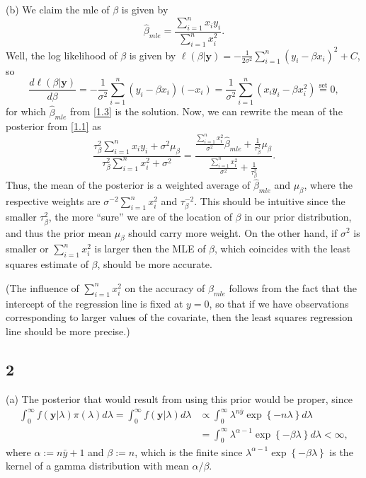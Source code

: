 \documentclass[12pt]{article}
\begin{document}
(b) We claim the mle of $\beta$ is given by 
\begin{equation}
  \hat{\beta}_{mle} = \frac{\sum_{i=1}^{n}x_i y_i}{\sum_{i=1}^{n}x_i^2}.
  \label{1.3}
\end{equation}
Well, the log likelihood of $\beta$ is given by $\ell(\beta|\bm{y}) = -\frac{1}{2\sigma^{2}}\sum_{i=1}^{n}(y_i - \beta x_i)^{2} + C$, so 
\[
  \frac{d\ell(\beta|\bm{y})}{d\beta} = -\frac{1}{\sigma^{2}}\sum_{i=1}^{n}(y_i - \beta x_i)(-x_i) = \frac{1}{\sigma^{2}}\sum_{i=1}^{n}(x_i y_i - \beta
x_i^{2}) \stackrel{\text{set}}{=} 0, \]
for which $\hat{\beta}_{mle}$ from \eqref{1.3} is the solution. Now, we can rewrite the mean of the posterior from \eqref{1.1} as 
\[
  \frac{\tau_{\beta}^2\sum_{i=1}^{n}x_i y_i + \sigma^{2}\mu_{\beta}}{\tau_{\beta}^2\sum_{i=1}^{n}x_i^2 + \sigma^2} = 
  \frac{\frac{\sum_{i=1}^{n}x_i^2}{\sigma^{2}} \hat{\beta}_{mle} + \frac{1}{\tau_{\beta}^2}\mu_{\beta}}{\frac{\sum_{i=1}^nx_i^2}{\sigma^{2}} +
  \frac{1}{\tau_{\beta}^2}}.
\]
Thus, the mean of the posterior is a weighted average of $\hat{\beta}_{mle}$ and $\mu_{\beta}$, where the respective weights 
are $\sigma^{-2}\sum_{i=1}^n x_i^2$ and $\tau_{\beta}^{-2}$. This should be intuitive since the smaller $\tau_{\beta}^2$, the more ``sure'' we are of the
location of $\beta$ in our prior distribution, and thus the prior mean $\mu_{\beta}$ should carry more weight. On the other hand, if $\sigma^2$ is
smaller or $\sum_{i=1}^n x_i^2$ is larger then the MLE of $\beta$, which coincides with the least squares estimate of $\beta$, should be more accurate.

{\small (The influence of $\sum_{i=1}^{n} x_i^2$ on the accuracy of $\hat{\beta}_{mle}$ follows from the fact that the intercept of the regression line is
fixed at $y = 0$, so that if we have observations corresponding to larger values of the covariate, then the least squares regression line should be
more precise.)}


\subsection*{2} (a) The posterior that would result from using this prior would be proper, since 
\begin{align*}
  \int_{0}^{\infty} f(\bm{y}|\lambda)\pi(\lambda)d\lambda = \int_{0}^{\infty}f(\bm{y}|\lambda)d\lambda & \propto
  \int_{0}^{\infty}\lambda^{n\bar{y}}\exp\left\{ -n\lambda \right\}d\lambda \\
  & = \int_{0}^{\infty}\lambda^{\alpha - 1}\exp\left\{ -\beta \lambda \right\}d\lambda < \infty,
\end{align*}
where $\alpha := n\bar{y} + 1$ and $\beta := n$, which is the finite since $\lambda^{\alpha-1}\exp\left\{ -\beta \lambda \right\}$ is the 
kernel of a gamma distribution with mean $\alpha / \beta$.
\end{document}
